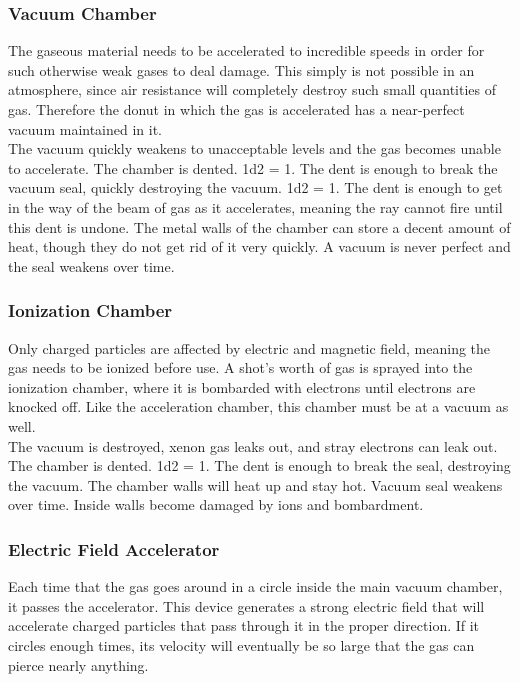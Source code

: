 \documentclass[a4paper]{article}
\begin{document}
\hspace{-18pt} \subsubsection{Vacuum Chamber} \label{ray_chamber} \vspace{-0.2cm}
The gaseous material needs to be accelerated to incredible speeds in order for such otherwise weak gases to deal damage. This simply is not possible in an atmosphere, since air resistance will completely destroy such small quantities of gas. Therefore the donut in which the gas is accelerated has a near-perfect vacuum maintained in it.
\\ \pbhw
{The vacuum quickly weakens to unacceptable levels and the gas becomes unable to accelerate.}
{The chamber is dented. \newline 1d2 = 1. The dent is enough to break the vacuum seal, quickly destroying the vacuum. \newline 1d2 = 1. The dent is enough to get in the way of the beam of gas as it accelerates, meaning the ray cannot fire until this dent is undone.}
{The metal walls of the chamber can store a decent amount of heat, though they do not get rid of it very quickly.}
{A vacuum is never perfect and the seal weakens over time. }


\vspace{-0.5cm} \hspace{-18pt} \subsubsection{Ionization Chamber} \label{ray_ionization} \vspace{-0.2cm}
Only charged particles are affected by electric and magnetic field, meaning the gas needs to be ionized before use. A shot's worth of gas is sprayed into the ionization chamber, where it is bombarded with electrons until electrons are knocked off. Like the acceleration chamber, this chamber must be at a vacuum as well.
\\ \pbhw
{The vacuum is destroyed, xenon gas leaks out, and stray electrons can leak out.}
{The chamber is dented. \newline 1d2 = 1. The dent is enough to break the seal, destroying the vacuum.}
{The chamber walls will heat up and stay hot.}
{Vacuum seal weakens over time. Inside walls become damaged by ions and bombardment.}


\vspace{-0.5cm} \hspace{-18pt} \subsubsection{Electric Field Accelerator} \label{ray_accelerator} \vspace{-0.2cm}
Each time that the gas goes around in a circle inside the main vacuum chamber, it passes the accelerator. This device generates a strong electric field that will accelerate charged particles that pass through it in the proper direction. If it circles enough times, its velocity will eventually be so large that the gas can pierce nearly anything.
\end{document}
